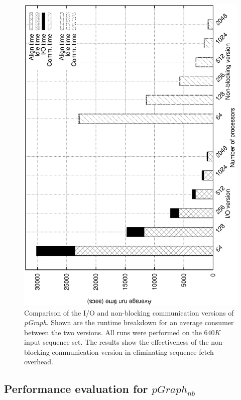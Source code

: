 \documentclass[10pt,journal,letterpaper,compsoc]{IEEEtran}
\begin{document}
\begin{figure}[tb]
\centerline{
						\includegraphics[angle=-90, scale=0.35]{csBreak.eps}
            }
\caption{
Comparison of the I/O and non-blocking communication versions of {\it pGraph}.  Shown are the runtime breakdown for an average consumer between the two versions. All runs were performed on the $640K$ input sequence set. The results show the effectiveness of the non-blocking communication version in eliminating sequence fetch overhead.
}
\label{figConsumerBreakdown}
\end{figure}

\subsection{Performance evaluation for $pGraph_{nb}$}
\label{secPerf}
\end{document}
